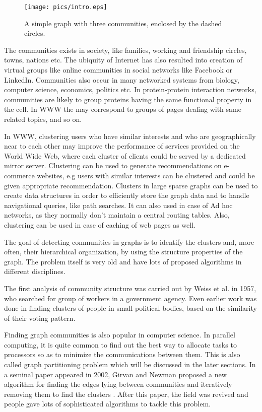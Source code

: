 \documentclass[letterpaper]{article}
\begin{document}
\begin{figure}
\texttt{[image: pics/intro.eps]}
\caption{A simple graph with three communities, enclosed by the dashed circles.}
\label{fig:bipart}
\end{figure}

The communities exists in society, like families, working and friendship
circles, towns, nations etc.  The ubiquity of Internet has also resulted into
creation of virtual groups like online communities in social networks like
Facebook or LinkedIn. Communities also occur in many networked systems from
biology, computer science, economics, politics etc.  In protein-protein
interaction networks, communities are likely to group proteins having the same
functional property in the cell. In WWW the may correspond to groups of pages
dealing with same related topics, and so on.


In WWW, clustering users who have similar interests and who are geographically
near to each other may improve the performance of services provided on the
World Wide Web, where each cluster of clients could be served by a dedicated
mirror server. Clustering can be used  to generate recommendations on
e-commerce websites, e.g users with similar interests can be clustered and
could be given appropriate recommendation.  Clusters in large sparse graphs can
be used to create data structures in order to efficiently store the graph data
and to handle navigational queries, like path searches. It can also used in
case of Ad hoc networks, as they normally don't maintain a central routing
tables. Also, clustering can be used in case of caching of web pages as well.

The goal of detecting communities in graphs is to identify the clusters and,
more often, their hierarchical organization, by using the structure properties
of the graph. The problem itself is very old and have lots of proposed
algorithms in different disciplines.

The first analysis of community structure was carried out by Weiss et al. in
1957, who searched for group of workers in a government agency. Even earlier
work was done in finding clusters of people in small political bodies, based on
the similarity of their voting pattern.

Finding graph communities is also popular in computer science. In parallel
computing, it is quite common to find out the best way to allocate tasks to
processors so as to minimize the communications between them. This is also
called graph partitioning problem which will be discussed in the later sections.
In a seminal paper appeared in 2002, Girvan and Newman proposed a new algorithm
for finding the edges lying between communities and iteratively removing them
to find the clusters \cite{new2002}. After this paper, the field was revived and people
gave lots of sophisticated algorithms to tackle this problem.
\end{document}
